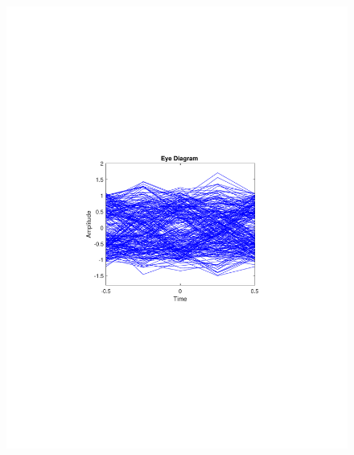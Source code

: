 \begin{refsection}
\begin{figure}[H]
\begin{minipage}{0.30\textwidth}
		\includegraphics[clip, trim=4cm 8cm 4cm 8cm, width=1\textwidth]{./sdf/m_qam_system/figures/expResults/intradyne/4_eye_16GBdInSig13dB_AfFE.pdf}
		\label{fig:16GBdSpecFE2}
	\end{minipage}
	\begin{minipage}{0.30\textwidth}
		\centering

\end{minipage}
\end{figure}
\end{refsection}
